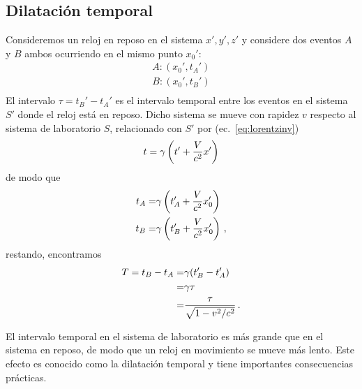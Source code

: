 \subsection{Dilatación temporal}
\begin{frame}
Consideremos un reloj en reposo en el sistema $x',y',z'$ y considere dos eventos $A$ y $B$ ambos ocurriendo en el mismo punto $x_0'$:
\begin{align*}
  A:(x_0',t_A')\nonumber\\
  B:(x_0',t_B')\nonumber\\
\end{align*}
El intervalo $\tau=t_B'-t_A'$ es el intervalo temporal entre los eventos en el sistema $S'$ donde el reloj está en reposo. Dicho sistema se mueve con rapidez $v$ respecto al sistema de laboratorio $S$, relacionado con $S'$ por (ec.~\eqref{eq:lorentzinv})
\begin{align*}
  t=\gamma\left(t'+\frac{V}{c^2}x'\right)
\end{align*}
de modo que
\begin{align*}
   t_A=&\gamma\left(t_A'+\frac{V}{c^2}x_0'\right)\nonumber\\
   t_B=&\gamma\left(t_B'+\frac{V}{c^2}x_0'\right)\,,
\end{align*}
restando, encontramos
\begin{align*}
  T=t_B-t_A=&\gamma(t_B'-t_A')\nonumber\\
  =&\gamma\tau\nonumber\\
  =&\frac{\tau}{\sqrt{1-v^2/c^2}}\,.
\end{align*}

El intervalo temporal en el sistema de laboratorio es más grande que en el sistema en reposo, de modo que un reloj en movimiento se mueve más lento. Este efecto es conocido como la dilatación temporal y tiene importantes consecuencias prácticas.


\end{frame}
